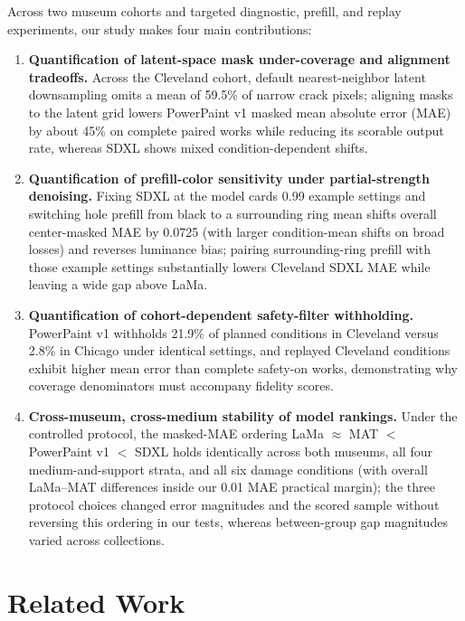 \documentclass[applsci,article,submit,pdftex,moreauthors]{Definitions/mdpi}
\providecommand{\tightlist}{\setlength{\itemsep}{0pt}\setlength{\parskip}{0pt}}
\begin{document}
Across two museum cohorts and targeted diagnostic, prefill, and replay experiments, our study makes four main contributions:

\begin{enumerate}
\def\labelenumi{\arabic{enumi}.}
\tightlist
\item
  \textbf{Quantification of latent-space mask under-coverage and alignment tradeoffs.} Across the Cleveland cohort, default nearest-neighbor latent downsampling omits a mean of 59.5\% of narrow crack pixels; aligning masks to the latent grid lowers PowerPaint v1 masked mean absolute error (MAE) by about 45\% on complete paired works while reducing its scorable output rate, whereas SDXL shows mixed condition-dependent shifts.
\item
  \textbf{Quantification of prefill-color sensitivity under partial-strength denoising.} Fixing SDXL at the model card\textquotesingle s 0.99 example settings and switching hole prefill from black to a surrounding ring mean shifts overall center-masked MAE by 0.0725 (with larger condition-mean shifts on broad losses) and reverses luminance bias; pairing surrounding-ring prefill with those example settings substantially lowers Cleveland SDXL MAE while leaving a wide gap above LaMa.
\item
  \textbf{Quantification of cohort-dependent safety-filter withholding.} PowerPaint v1 withholds 21.9\% of planned conditions in Cleveland versus 2.8\% in Chicago under identical settings, and replayed Cleveland conditions exhibit higher mean error than complete safety-on works, demonstrating why coverage denominators must accompany fidelity scores.
\item
  \textbf{Cross-museum, cross-medium stability of model rankings.} Under the controlled protocol, the masked-MAE ordering LaMa \(\approx\) MAT \(\!<\!\) PowerPaint v1 \(\!<\!\) SDXL holds identically across both museums, all four medium-and-support strata, and all six damage conditions (with overall LaMa--MAT differences inside our 0.01 MAE practical margin); the three protocol choices changed error magnitudes and the scored sample without reversing this ordering in our tests, whereas between-group gap magnitudes varied across collections.
\end{enumerate}

\section{Related Work}\label{related-work}
\end{document}
